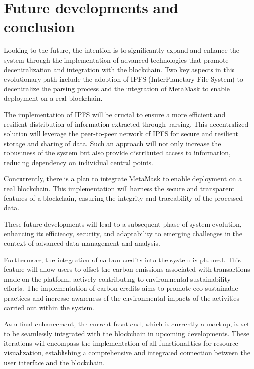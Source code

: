 \chapter*{Future developments and conclusion}

Looking to the future, the intention is to significantly expand and enhance the system through the implementation of advanced technologies that promote decentralization and integration with the blockchain. Two key aspects in this evolutionary path include the adoption of IPFS (InterPlanetary File System) to decentralize the parsing process and the integration of MetaMask to enable deployment on a real blockchain.

The implementation of IPFS will be crucial to ensure a more efficient and resilient distribution of information extracted through parsing. This decentralized solution will leverage the peer-to-peer network of IPFS for secure and resilient storage and sharing of data. Such an approach will not only increase the robustness of the system but also provide distributed access to information, reducing dependency on individual central points.

Concurrently, there is a plan to integrate MetaMask to enable deployment on a real blockchain. This implementation will harness the secure and transparent features of a blockchain, ensuring the integrity and traceability of the processed data.

These future developments will lead to a subsequent phase of system evolution, enhancing its efficiency, security, and adaptability to emerging challenges in the context of advanced data management and analysis.

Furthermore, the integration of carbon credits into the system is planned. This feature will allow users to offset the carbon emissions associated with transactions made on the platform, actively contributing to environmental sustainability efforts. The implementation of carbon credits aims to promote eco-sustainable practices and increase awareness of the environmental impacts of the activities carried out within the system.

As a final enhancement, the current front-end, which is currently a mockup, is set to be seamlessly integrated with the blockchain in upcoming developments. These iterations will encompass the implementation of all functionalities for resource visualization, establishing a comprehensive and integrated connection between the user interface and the blockchain.